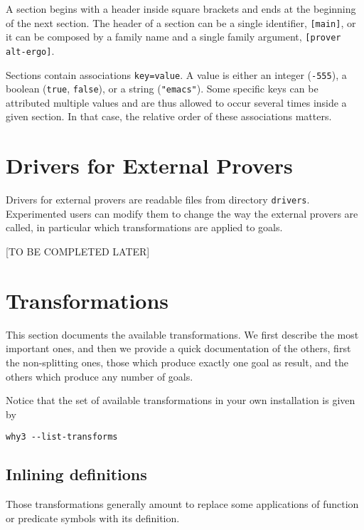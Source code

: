 A section begins with a header inside square brackets and ends at the
beginning of the next section. The header of a section can be a single
identifier, \eg \texttt{[main]}, or it can be composed by a family name
and a single family argument, \eg \texttt{[prover alt-ergo]}.

Sections contain associations \texttt{key=value}. A value is either
an integer (\eg \texttt{-555}), a boolean (\texttt{true}, \texttt{false}),
or a string (\eg \texttt{"emacs"}). Some specific keys can be attributed
multiple values and are
thus allowed to occur several times inside a given section. In that
case, the relative order of these associations matters.

\section{Drivers for External Provers}
\label{sec:drivers}

Drivers for external provers are readable files from directory
\texttt{drivers}. Experimented users can modify them to change the way
the external provers are called, in particular which transformations
are applied to goals.

[TO BE COMPLETED LATER]

\section{Transformations}
\label{sec:transformations}

This section documents the available transformations. We first
describe the most important ones, and then we provide a quick
documentation of the others, first the non-splitting ones, \eg those
which produce exactly one goal as result, and the others which produce any
number of goals.

Notice that the set of available transformations in your own
installation is given by
\begin{verbatim}
why3 --list-transforms
\end{verbatim}

\subsection{Inlining definitions}

Those transformations generally amount to replace some applications of
function or predicate symbols with its definition.

